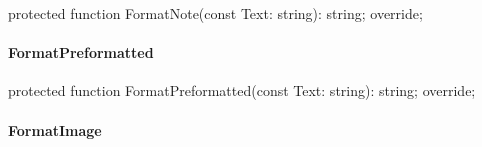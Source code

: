 \documentclass{report}
\newif\ifpdf
\begin{document}
\label{PasDoc_GenHtml.TGenericHTMLDocGenerator-FormatNote}
\begin{list}{}{
\setlength{\itemindent}{0cm}
\setlength{\listparindent}{0cm}
\setlength{\leftmargin}{\evensidemargin}
\addtolength{\leftmargin}{\tmplength}
\settowidth{\labelsep}{X}
\addtolength{\leftmargin}{\labelsep}
\setlength{\labelwidth}{\tmplength}
}
\item[\textbf{Declaration}\hfill]
\ifpdf
\begin{flushleft}
\fi
\begin{ttfamily}
protected function FormatNote(const Text: string): string; override;\end{ttfamily}

\ifpdf
\end{flushleft}
\fi

\end{list}
\paragraph*{FormatPreformatted}\hspace*{\fill}

\label{PasDoc_GenHtml.TGenericHTMLDocGenerator-FormatPreformatted}
\begin{list}{}{
\setlength{\itemindent}{0cm}
\setlength{\listparindent}{0cm}
\setlength{\leftmargin}{\evensidemargin}
\addtolength{\leftmargin}{\tmplength}
\settowidth{\labelsep}{X}
\addtolength{\leftmargin}{\labelsep}
\setlength{\labelwidth}{\tmplength}
}
\item[\textbf{Declaration}\hfill]
\ifpdf
\begin{flushleft}
\fi
\begin{ttfamily}
protected function FormatPreformatted(const Text: string): string; override;\end{ttfamily}

\ifpdf
\end{flushleft}
\fi

\end{list}
\paragraph*{FormatImage}\hspace*{\fill}
\end{document}
